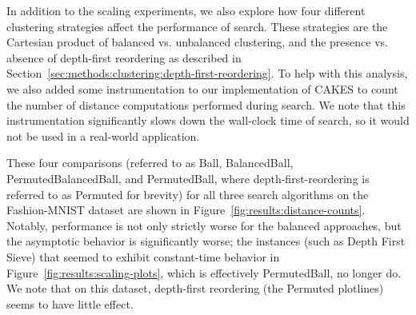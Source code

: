 In addition to the scaling experiments, we also explore how four different clustering strategies affect the performance of search. These strategies are the Cartesian product of balanced vs. unbalanced clustering, and the presence vs. absence of depth-first reordering as described in Section~\ref{sec:methods:clustering:depth-first-reordering}.
To help with this analysis, we also added some instrumentation to our implementation of CAKES to count the number of distance computations performed during search. We note that this instrumentation significantly slows down the wall-clock time of search, so it would not be used in a real-world application.

These four comparisons (referred to as Ball, BalancedBall, PermutedBalancedBall, and PermutedBall, where depth-first-reordering is referred to as Permuted for brevity) for all three search algorithms on the Fashion-MNIST dataset are shown in Figure~\ref{fig:results:distance-counts}. Notably, performance is not only strictly worse for the balanced approaches, but the asymptotic behavior is significantly worse; the instances (such as Depth First Sieve) that seemed to exhibit constant-time behavior in Figure~\ref{fig:results:scaling-plots}, which is effectively PermutedBall, no longer do. We note that on this dataset, depth-first reordering (the Permuted plotlines) seems to have little effect.


